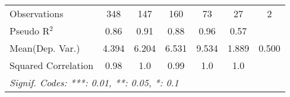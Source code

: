 \begin{tabular}{lcccccc}
   Observations                                               & 348           & 147        & 160       & 73             & 27            & 2\\  
   Pseudo R$^2$                                               & 0.86          & 0.91       & 0.88      & 0.96           & 0.57          & \\  
Mean(Dep. Var.) & 4.394 & 6.204 & 6.531 & 9.534 & 1.889 & 0.500 \\
   Squared Correlation                                        & 0.98          & 1.0        & 0.99      & 1.0            & 1.0           & \\  
   \midrule \midrule
   \multicolumn{7}{l}{\emph{Signif. Codes: ***: 0.01, **: 0.05, *: 0.1}}\\
\end{tabular}
\par\endgroup
